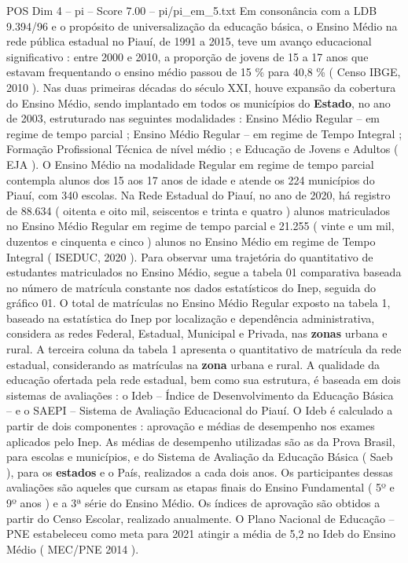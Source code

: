 \begin{textsample}{POS Dim 4 – pi – Score 7.00 – pi/pi\_em\_5.txt}
Em consonância com a LDB 9.394/96 e o propósito de universalização da educação básica, o Ensino Médio na rede pública estadual no Piauí, de 1991 a 2015, teve um avanço educacional significativo : entre 2000 e 2010, a proporção de jovens de 15 a 17 anos que estavam frequentando o ensino médio passou de 15 \% para 40,8 \% ( Censo IBGE, 2010 ).
Nas duas primeiras décadas do século XXI, houve expansão da cobertura do Ensino Médio, sendo implantado em todos os municípios do \textbf{Estado}, no ano de 2003, estruturado nas seguintes modalidades : Ensino Médio Regular – em regime de tempo parcial ; Ensino Médio Regular – em regime de Tempo Integral ; Formação Profissional Técnica de nível médio ; e Educação de Jovens e Adultos ( EJA ).
O Ensino Médio na modalidade Regular em regime de tempo parcial contempla alunos dos 15 aos 17 anos de idade e atende os 224 municípios do Piauí, com 340 escolas.
Na Rede Estadual do Piauí, no ano de 2020, há registro de 88.634 ( oitenta e oito mil, seiscentos e trinta e quatro ) alunos matriculados no Ensino Médio Regular em regime de tempo parcial e 21.255 ( vinte e um mil, duzentos e cinquenta e cinco ) alunos no Ensino Médio em regime de Tempo Integral ( ISEDUC, 2020 ).
Para observar uma trajetória do quantitativo de estudantes matriculados no Ensino Médio, segue a tabela 01 comparativa baseada no número de matrícula constante nos dados estatísticos do Inep, seguida do gráfico 01.
O total de matrículas no Ensino Médio Regular exposto na tabela 1, baseado na estatística do Inep por localização e dependência administrativa, considera as redes Federal, Estadual, Municipal e Privada, nas \textbf{zonas} urbana e rural.
A terceira coluna da tabela 1 apresenta o quantitativo de matrícula da rede estadual, considerando as matrículas na \textbf{zona} urbana e rural.
A qualidade da educação ofertada pela rede estadual, bem como sua estrutura, é baseada em dois sistemas de avaliações : o Ideb – Índice de Desenvolvimento da Educação Básica – e o SAEPI – Sistema de Avaliação Educacional do Piauí.
O Ideb é calculado a partir de dois componentes : aprovação e médias de desempenho nos exames aplicados pelo Inep.
As médias de desempenho utilizadas são as da Prova Brasil, para escolas e municípios, e do Sistema de Avaliação da Educação Básica ( Saeb ), para os \textbf{estados} e o País, realizados a cada dois anos.
Os participantes dessas avaliações são aqueles que cursam as etapas finais do Ensino Fundamental ( 5º e 9º anos ) e a 3ª série do Ensino Médio.
Os índices de aprovação são obtidos a partir do Censo Escolar, realizado anualmente.
O Plano Nacional de Educação – PNE estabeleceu como meta para 2021 atingir a média de 5,2 no Ideb do Ensino Médio ( MEC/PNE 2014 ).

\end{textsample}
